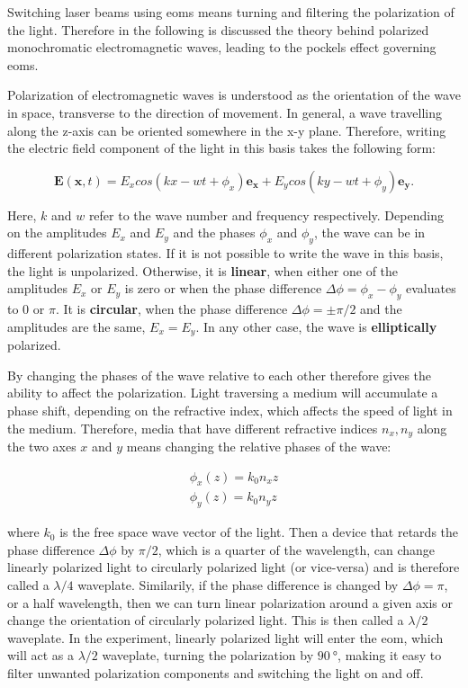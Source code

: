 Switching laser beams using \acp{eom} means turning and filtering the polarization of the light. Therefore in the following is discussed the theory behind polarized monochromatic electromagnetic waves, leading to the pockels effect governing \acp{eom}.

Polarization of electromagnetic waves is understood as the orientation of the wave in space, transverse to the direction of movement. In general, a wave travelling along the z-axis can be oriented somewhere in the x-y plane. Therefore, writing the electric field component of the light in this basis takes the following form:

\begin{equation}
	\mathbf{E}(\mathbf{x}, t) = E_x cos\left(kx - wt + \phi_x\right) \mathbf{e_x} + E_y cos\left(ky - wt + \phi_y\right) \mathbf{e_y} .
\end{equation}

Here, $k$ and $w$ refer to the wave number and frequency respectively.
Depending on the amplitudes $E_x$ and $E_y$ and the phases $\phi_x$ and $\phi_y$, the wave can be in different polarization states. If it is not possible to write the wave in this basis, the light is unpolarized. Otherwise, it is \textbf{linear}, when either one of the amplitudes $E_x$ or $E_y$ is zero or when the phase difference $\Delta \phi = \phi_x - \phi_y$ evaluates to 0 or $\pi$. It is \textbf{circular}, when the phase difference $\Delta \phi = \pm \pi/2$ and the amplitudes are the same, $E_x = E_y$. In any other case, the wave is \textbf{elliptically} polarized.

By changing the phases of the wave relative to each other therefore gives the ability to affect the polarization. Light traversing a medium will accumulate a phase shift, depending on the refractive index, which affects the speed of light in the medium. Therefore, media that have different refractive indices $n_x, n_y$ along the two axes $x$ and $y$ means changing the relative phases of the wave:

\begin{align}
	\label{eq:pol,phases}
	\phi_x(z) = k_0 n_x z \\
	\phi_y(z) = k_0 n_y z
\end{align}

where $k_0$ is the free space wave vector of the light. Then a device that retards the phase difference $\Delta \phi$ by $\pi/2$, which is a quarter of the wavelength, can change linearly polarized light to circularly polarized light (or vice-versa) and is therefore called a $\lambda / 4$ waveplate. Similarily, if the phase difference is changed by $\Delta \phi = \pi$, or a half wavelength, then we can turn linear polarization around a given axis or change the orientation of circularly polarized light. This is then called a $\lambda / 2$ waveplate. In the experiment, linearly polarized light will enter the \ac{eom}, which will act as a $\lambda / 2$ waveplate, turning the polarization by $\SI{90}{\degree}$, making it easy to filter unwanted polarization components and switching the light on and off.

